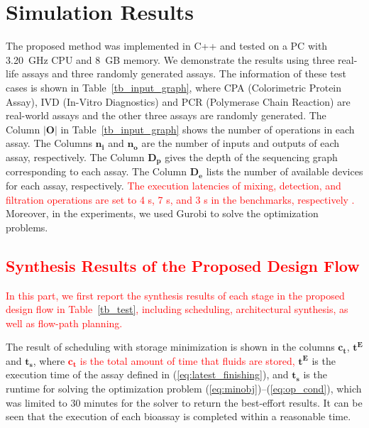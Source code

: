 \section{Simulation Results}\label{sec:results}





The proposed method was implemented in C++ and tested on a PC with \SI[mode=text]{3.20}{\GHz} CPU and
\SI{8}{GB} memory. We demonstrate the results using three real-life assays and three randomly generated assays. The information of these test cases is shown in Table~\ref{tb_input_graph}, where CPA (Colorimetric Protein Assay), IVD (In-Vitro Diagnostics) and PCR (Polymerase Chain Reaction) are real-world assays \textcolor{red}{\cite{pop2016microfluidic}} and the other three assays are randomly generated. The Column $\boldsymbol{|O|}$ in Table~\ref{tb_input_graph} shows the number of operations in each assay. The Columns $\boldsymbol{n_i}$ and $\boldsymbol{n_o}$ are the number of inputs and outputs of each assay, respectively. The Column $\boldsymbol{D_p}$ gives the depth of the sequencing graph corresponding to each assay. The Column $\boldsymbol{D_e}$ lists the number of available devices for each assay, respectively. \textcolor{red}{The execution latencies of mixing, detection, and filtration operations are set to 4 s, 7 s, and 3 s in the benchmarks, respectively \cite{pop2016microfluidic}.} Moreover, in the experiments, we used Gurobi \cite{gurobi} to solve the optimization problems.

\subsection{\textcolor{red}{Synthesis Results of the Proposed Design Flow}}

\textcolor{red}{In this part, we first report the synthesis results of each stage in the proposed design flow in Table~\ref{tb_test}, including scheduling, architectural synthesis, as well as flow-path planning.}

The result of scheduling with storage minimization is shown in the columns $\boldsymbol{c_t}$, $\boldsymbol{t^E}$ and $\boldsymbol{t_s}$, where \textcolor{red}{$\boldsymbol{c_t}$ is the total amount of time that fluids are stored,} $\boldsymbol{t^E}$ is the execution time of the assay defined in (\ref{eq:latest_finishing}), and $\boldsymbol{t_s}$ is the runtime for solving the optimization problem (\ref{eq:minobj})--(\ref{eq:op_cond}), which was limited to 30 minutes for the solver to return the best-effort results. It can be seen that the execution of each bioassay is completed within a reasonable time.


